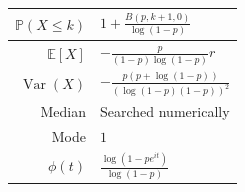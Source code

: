 \documentclass[a4paper,11pt]{article}
\theoremstyle{plain}
\theoremstyle{definition}
\newcommand{\ME}{\mathbb{E}}
\newcommand{\MP}{\mathbb{P}}
\newcommand{\Var}{\operatorname{Var}}
\begin{document}
\begin{figure}[!htb]
\begin{minipage}{0.4\textwidth}
\begin{tabular}{| r | l |}
   				\hline
   				$\MP(X \leq k)$ & $1 + \frac{B(p, k+1, 0)}{\log(1-p)}$ \\
   				\hline
   				$\ME[X]$ & $ -\frac{p}{(1-p)\log(1-p)}r$ \\
   				\hline
   				$\Var(X)$ & $ -\frac{p(p + \log(1-p))}{(\log(1-p) (1-p))^2} $ \\
   				\hline
   				Median & Searched numerically \\
   				\hline
   				Mode & $1$ \\
   				\hline
   				$\phi(t)$ & $ \frac{\log(1-pe^{it})}{\log(1-p)} $  \\
   				\hline
   			\end{tabular}
   		\end{minipage}
   	\end{figure}

		
	\pagebreak
\end{document}
